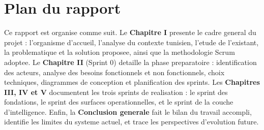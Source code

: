 \section*{Plan du rapport}
Ce rapport est organise comme suit. Le \textbf{Chapitre I} presente le
cadre general du projet : l'organisme d'accueil, l'analyse du contexte
tunisien, l'etude de l'existant, la problematique et la solution proposee,
ainsi que la methodologie Scrum adoptee. Le \textbf{Chapitre II} (Sprint 0)
detaille la phase preparatoire : identification des acteurs, analyse des
besoins fonctionnels et non fonctionnels, choix techniques, diagrammes de
conception et planification des sprints. Les \textbf{Chapitres III, IV et V}
documentent les trois sprints de realisation : le sprint des fondations, le
sprint des surfaces operationnelles, et le sprint de la couche
d'intelligence. Enfin, la \textbf{Conclusion generale} fait le bilan du
travail accompli, identifie les limites du systeme actuel, et trace les
perspectives d'evolution future.
